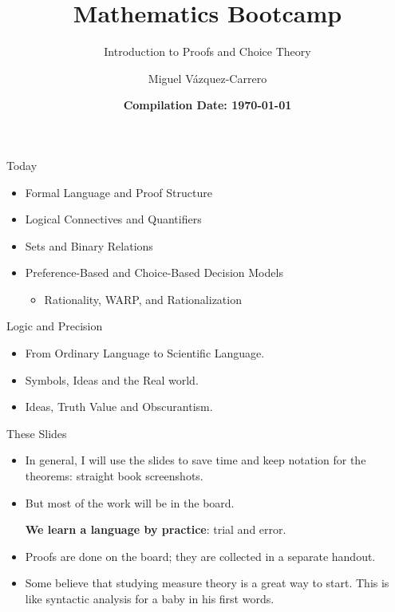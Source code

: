 \documentclass[11pt,aspectratio=169,c]{beamer}
\title{\textbf{Mathematics Bootcamp}}
\subtitle{Introduction to Proofs and Choice Theory}
\author{Miguel Vázquez-Carrero}
\date{\textbf{Compilation Date: \today}}
\begin{document}
\begin{frame}
\vfill
\titlepage
\vfill
\end{frame}

\begin{frame}{Today}
\begin{itemize}
    \item Formal Language and Proof Structure
    \item Logical Connectives and Quantifiers
    \item Sets and Binary Relations
    \item Preference-Based and Choice-Based Decision Models
    \begin{itemize}
        \item Rationality, WARP, and Rationalization
    \end{itemize}
\end{itemize}
\end{frame}


\begin{frame}{Logic and Precision}

\begin{itemize}
    \item From Ordinary Language to Scientific Language.
    \item Symbols, Ideas and the Real world.
    \item Ideas, Truth Value and Obscurantism.
\end{itemize}
\end{frame}

\begin{frame}{These Slides}

\begin{itemize}
    \item In general, I will use the slides to save time and keep notation for the theorems: straight book screenshots.
    \item But most of the work will be in the board. \par \textbf{We learn a language by practice}: trial and error.
    \item Proofs are done on the board; they are collected in a separate handout.
    \item Some believe that studying measure theory is a great way to start. This is like syntactic analysis for a baby in his first words.
\end{itemize}

\end{frame}
\end{document}
